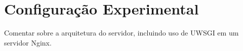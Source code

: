 \chapter{Configuração Experimental~\label{chp:configs}}

\begin{todolist}
    \item Comentar sobre a arquitetura do servidor, incluindo uso de UWSGI em
          um servidor Nginx.
\end{todolist}
